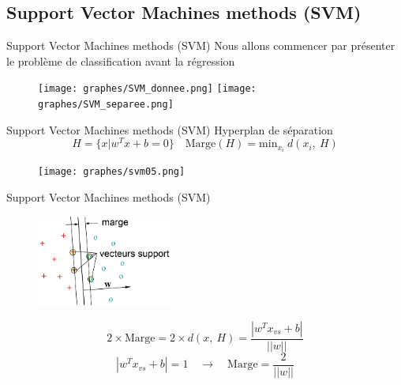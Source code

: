 \documentclass{beamer}
\begin{document}
\subsection{Support Vector Machines methods (SVM)}
\begin{frame}{Support Vector Machines methods (SVM)}
Nous allons commencer par présenter le problème de classification avant la régression
\begin{figure}[!h]
	\begin{center}
	\centering	
		\texttt{[image: graphes/SVM\_donnee.png]}
		\texttt{[image: graphes/SVM\_separee.png]}
	\end{center}
\end{figure}
\end{frame}
\begin{frame}{Support Vector Machines methods (SVM)}
 Hyperplan de séparation 
\[
H = \{x | w^T x + b =0\} \quad
\text{Marge}(H) = \text{min}_{x_{i}}\ d(x_i,\ H)
\]

\begin{figure}[!h]
	\begin{center}
	\centering	
		\texttt{[image: graphes/svm05.png]}
	\end{center}
\end{figure}
\end{frame}
\begin{frame}{Support Vector Machines methods (SVM)}
\begin{figure}[!h]
	\begin{center}
	\centering	
		\includegraphics[height =3cm, keepaspectratio]{graphes/svm07.png}
	\end{center}
\end{figure}
\[ 
2 \times \text{Marge} = 2 \times d(x,\ H) = \frac{|w^T x_{vs} + b|}{||w||}
\]
\[|w^T x_{vs} + b| = 1 \quad \rightarrow \quad \text{Marge} = \frac{2}{||w||} \]
\end{frame}
\end{document}
